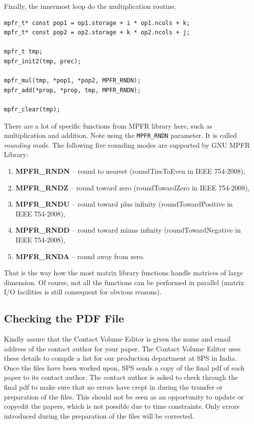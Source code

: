 \documentclass[runningheads,a4paper]{llncs}
\begin{document}
Finally, the innermost loop do the multiplication routine.

\begin{verbatim}
mpfr_t* const pop1 = op1.storage + i * op1.ncols + k;
mpfr_t* const pop2 = op2.storage + k * op2.ncols + j;

mpfr_t tmp;
mpfr_init2(tmp, prec);

mpfr_mul(tmp, *pop1, *pop2, MPFR_RNDN);
mpfr_add(*prop, *prop, tmp, MPFR_RNDN);

mpfr_clear(tmp);
\end{verbatim}

There are a lot of specific functions from MPFR library here, such as multiplication and addition. Note using the \texttt{MPFR\_RNDN} parameter. It is called \textit{rounding mode}. The following five rounding modes are supported by GNU MPFR Library:

\begin{enumerate}
\item\textbf{MPFR\_RNDN} -- round to nearest (roundTiesToEven in IEEE 754-2008),
\item\textbf{MPFR\_RNDZ} -- round toward zero (roundTowardZero in IEEE 754-2008),
\item\textbf{MPFR\_RNDU} -- round toward plus infinity (roundTowardPositive in IEEE 754-2008),
\item\textbf{MPFR\_RNDD} -- round toward minus infinity (roundTowardNegative in IEEE 754-2008),
\item\textbf{MPFR\_RNDA} -- round away from zero. 
\end{enumerate}

That is the way how the most matrix library functions handle matrices of large dimension. Of course, not all the functions can be performed in parallel (matrix I/O facilities is still consequent for obvious reasons).

\subsection{Checking the PDF File}

Kindly assure that the Contact Volume Editor is given the name and email
address of the contact author for your paper. The Contact Volume Editor
uses these details to compile a list for our production department at
SPS in India. Once the files have been worked upon, SPS sends a copy of
the final pdf of each paper to its contact author. The contact author is
asked to check through the final pdf to make sure that no errors have
crept in during the transfer or preparation of the files. This should
not be seen as an opportunity to update or copyedit the papers, which is
not possible due to time constraints. Only errors introduced during the
preparation of the files will be corrected.
\end{document}
